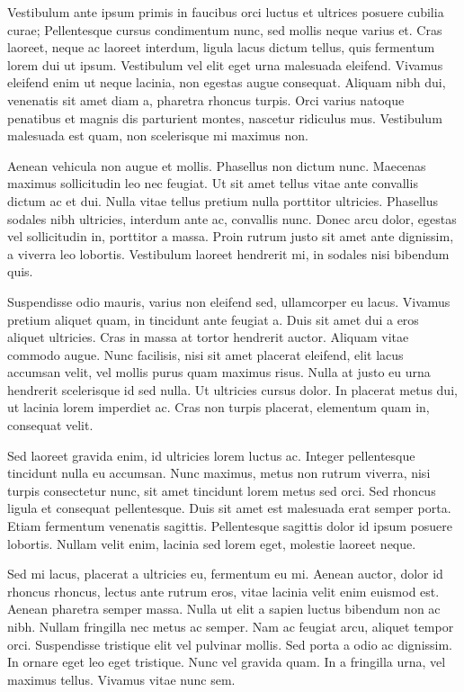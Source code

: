 Vestibulum ante ipsum primis in faucibus orci luctus et ultrices posuere cubilia curae; Pellentesque cursus condimentum nunc, sed mollis neque varius et. Cras laoreet, neque ac laoreet interdum, ligula lacus dictum tellus, quis fermentum lorem dui ut ipsum. Vestibulum vel elit eget urna malesuada eleifend. Vivamus eleifend enim ut neque lacinia, non egestas augue consequat. Aliquam nibh dui, venenatis sit amet diam a, pharetra rhoncus turpis. Orci varius natoque penatibus et magnis dis parturient montes, nascetur ridiculus mus. Vestibulum malesuada est quam, non scelerisque mi maximus non.

Aenean vehicula non augue et mollis. Phasellus non dictum nunc. Maecenas maximus sollicitudin leo nec feugiat. Ut sit amet tellus vitae ante convallis dictum ac et dui. Nulla vitae tellus pretium nulla porttitor ultricies. Phasellus sodales nibh ultricies, interdum ante ac, convallis nunc. Donec arcu dolor, egestas vel sollicitudin in, porttitor a massa. Proin rutrum justo sit amet ante dignissim, a viverra leo lobortis. Vestibulum laoreet hendrerit mi, in sodales nisi bibendum quis.

Suspendisse odio mauris, varius non eleifend sed, ullamcorper eu lacus. Vivamus pretium aliquet quam, in tincidunt ante feugiat a. Duis sit amet dui a eros aliquet ultricies. Cras in massa at tortor hendrerit auctor. Aliquam vitae commodo augue. Nunc facilisis, nisi sit amet placerat eleifend, elit lacus accumsan velit, vel mollis purus quam maximus risus. Nulla at justo eu urna hendrerit scelerisque id sed nulla. Ut ultricies cursus dolor. In placerat metus dui, ut lacinia lorem imperdiet ac. Cras non turpis placerat, elementum quam in, consequat velit.

Sed laoreet gravida enim, id ultricies lorem luctus ac. Integer pellentesque tincidunt nulla eu accumsan. Nunc maximus, metus non rutrum viverra, nisi turpis consectetur nunc, sit amet tincidunt lorem metus sed orci. Sed rhoncus ligula et consequat pellentesque. Duis sit amet est malesuada erat semper porta. Etiam fermentum venenatis sagittis. Pellentesque sagittis dolor id ipsum posuere lobortis. Nullam velit enim, lacinia sed lorem eget, molestie laoreet neque.

Sed mi lacus, placerat a ultricies eu, fermentum eu mi. Aenean auctor, dolor id rhoncus rhoncus, lectus ante rutrum eros, vitae lacinia velit enim euismod est. Aenean pharetra semper massa. Nulla ut elit a sapien luctus bibendum non ac nibh. Nullam fringilla nec metus ac semper. Nam ac feugiat arcu, aliquet tempor orci. Suspendisse tristique elit vel pulvinar mollis. Sed porta a odio ac dignissim. In ornare eget leo eget tristique. Nunc vel gravida quam. In a fringilla urna, vel maximus tellus. Vivamus vitae nunc sem.


